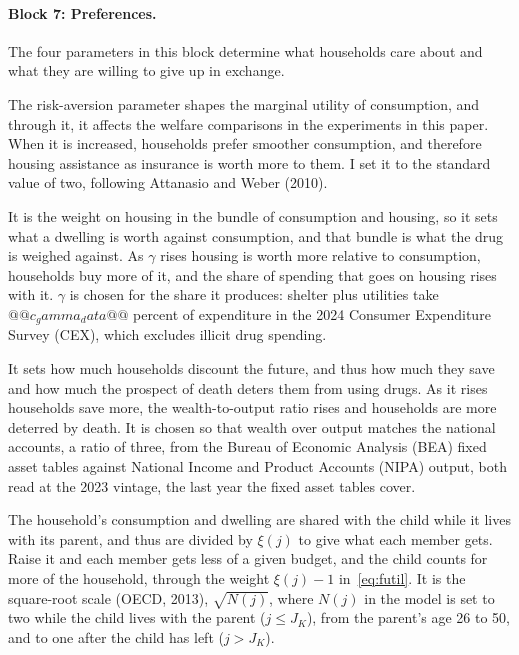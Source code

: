 \documentclass[10pt]{article}
\begin{document}



\paragraph{Block 7: Preferences.}  The four parameters in this block determine what households care about and what they are willing to give up in exchange.
\begin{description}\setlength{\itemsep}{0.25em}\setlength{\parskip}{0em}
\item[$\sigma$, risk aversion.]  The risk-aversion parameter shapes the marginal utility of consumption, and through it, it affects the welfare comparisons in the experiments in this paper. When it is increased, households prefer smoother consumption, and therefore housing assistance as insurance is worth more to them. I set it to the standard value of two, following
Attanasio and Weber (2010).
\item[$\gamma$, the weight on housing services.] It is the weight on housing in the
bundle of consumption and housing, so it sets what a dwelling is worth against
consumption, and that bundle is what the drug is weighed against. As
$\gamma$ rises housing is worth more relative to consumption, households buy more of it,
and the share of spending that goes on housing rises with it. $\gamma$ is chosen for the share
it produces: shelter plus utilities take $@@c_gamma_data@@$ percent of expenditure in the 2024 Consumer Expenditure Survey (CEX), which excludes illicit drug spending.
\item[$\beta$, the discount factor.] It sets how much households discount the
future, and thus how much they save and how much the prospect of death deters them from using drugs. As it rises households save more, the
 wealth-to-output ratio rises and households are more deterred by death. It is chosen so that wealth over output
matches the national accounts, a ratio of three, from the Bureau of Economic Analysis (BEA) fixed asset tables
against National Income and Product Accounts (NIPA) output, both read at the 2023 vintage, the last year the fixed asset tables cover.
\item[$\xi(j)$, the equivalence scale.] The household's consumption and
dwelling are shared with the child while it lives with its parent, and thus are divided by
$\xi(j)$ to give what each member gets. Raise it and each member gets less of a given budget, and the child counts for more of the household, through the weight $\xi(j)-1$ in~\eqref{eq:futil}. It is the square-root scale (OECD, 2013), $\sqrt{N(j)}$, where $N(j)$ in the model is set to two while
the child lives with the parent ($j\le J_K$), from the parent's age 26 to 50, and to one after the child has left ($j>J_K$).
\end{description}
\end{document}
